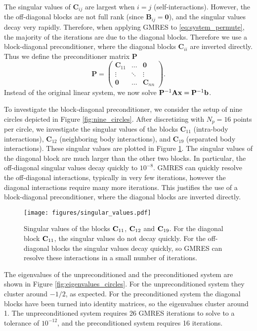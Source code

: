 The singular values of $\mathbf{C}_{ij}$ are largest when $i=j$ (self-interactions). However, the the off-diagonal blocks are not full rank (since $\mathbf{B}_{ij} = \mathbf{0}$), and the singular values decay very rapidly. Therefore, when applying GMRES to \eqref{eq:system_permute}, the majority of the iterations are due to the diagonal blocks. Therefore we use a block-diagonal preconditioner, where the diagonal blocks $\mathbf{C}_{ii}$ are inverted directly. Thus we define the preconditioner matrix $\mathbf{P}$
\[ \mathbf{P} = \begin{pmatrix} \mathbf{C}_{11} & \hdots & \mathbf{0} \\ \vdots & \ddots & \vdots\\\mathbf{0} & \hdots & \mathbf{C}_{nn}\end{pmatrix}.\]
Instead of the original linear system, we now solve $\mathbf{P}^{-1}\mathbf{A}{\mathbf{x}} = \mathbf{P}^{-1}{\mathbf{b}}$. 

To investigate the block-diagonal preconditioner, we consider the setup of nine circles depicted in Figure \ref{fig:nine_circles}. After discretizing with $N_p=16$ points per circle, we investigate the singular values of the blocks $\mathbf{C}_{11}$ (intra-body interactions), $\mathbf{C}_{12}$ (neighboring body interactions), and $\mathbf{C}_{19}$ (separated body interactions).  These singular values are plotted in Figure \ref{fig:svd}. The singular values of the diagonal block are much larger than the other two blocks. In particular, the off-diagonal singular values decay quickly to $10^{-8}$. GMRES can quickly resolve the off-diagonal interactions, typically in very few iterations, however the diagonal interactions require many more iterations. This justifies the use of a block-diagonal preconditioner, where the diagonal blocks are inverted directly.

\begin{figure}[!h]
\begin{center}
\texttt{[image: figures/singular\_values.pdf]}
\end{center}
\caption[Singular values of blocks in linear system]{Singular values of the blocks ${\mathbf{C}}_{11}$, ${\mathbf{C}}_{12}$ and ${\mathbf{C}}_{19}$. For the diagonal block ${\mathbf{C}}_{11}$, the singular values do not decay quickly. For the off-diagonal blocks the singular values decay quickly, so GMRES can resolve these interactions in a small number of iterations.}\label{fig:svd}
\end{figure}

The eigenvalues of the unpreconditioned and the preconditioned system are shown in Figure \ref{fig:eigenvalues_circles}. For the unpreconditioned system they cluster around $-1/2$, as expected. For the preconditioned system the diagonal blocks have been turned into identity matrices, so the eigenvalues cluster around 1. The unpreconditioned system requires 26 GMRES iterations to solve to a tolerance of $10^{-12}$, and the preconditioned system requires 16 iterations.

